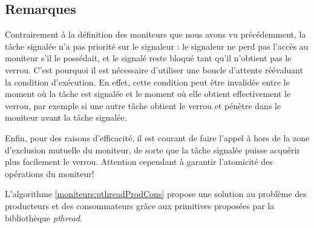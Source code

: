 \subsection*{Remarques}
Contrairement à la définition des moniteurs que nous avons vu précédemment, la tâche signalée n'a pas priorité sur le signaleur : le signaleur ne perd pas l'accès au moniteur s'il le possédait, et le signalé reste bloqué tant qu'il n'obtient pas le verrou. C'est pourquoi il est nécessaire d'utiliser une boucle d'attente réévaluant la condition d'exécution. En effet, cette condition peut être invalidée entre le moment où la tâche est signalée et le moment où elle obtient effectivement le verrou, par exemple si une autre tâche obtient le verrou et pénètre dans le moniteur avant la tâche signalée.

Enfin, pour des raisons d'efficacité, il est courant de faire l'appel à  hors de la zone d'exclusion mutuelle du moniteur, de sorte que la tâche signalée puisse acquérir plus facilement le verrou. Attention cependant à garantir l'atomicité des opérations du moniteur!

L'algorithme \ref{moniteurs:pthreadProdCons} propose une solution au problème des producteurs et des consommateurs grâce aux primitives proposées par la bibliothèque {\em pthread}.


